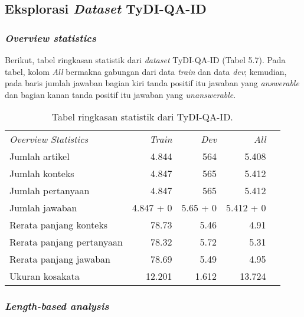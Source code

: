 \subsection{Eksplorasi \emph{Dataset} TyDI-QA-ID}

\subsubsection{\emph{Overview statistics}}
Berikut, tabel ringkasan statistik dari \emph{dataset} TyDI-QA-ID (Tabel 5.7). Pada tabel, kolom \emph{All} bermakna gabungan dari data \emph{train} dan data \emph{dev}; kemudian, pada baris jumlah jawaban bagian kiri tanda positif itu jawaban yang \emph{answerable} dan bagian kanan tanda positif itu jawaban yang \emph{unanswerable}.

\begin{table}[H]\centering
\begin{tabular}{lrrrr}\toprule
\emph{Overview Statistics} &\emph{Train} &\emph{Dev} &\emph{All} \\
Jumlah artikel &4.844 &564 &5.408 & \\
Jumlah konteks &4.847 &565 &5.412 & \\
Jumlah pertanyaan &4.847 &565 &5.412 & \\
Jumlah jawaban &4.847 + 0 &5.65 + 0 &5.412 + 0 & \\
Rerata panjang konteks &78.73 &5.46 &4.91 & \\
Rerata panjang pertanyaan &78.32 &5.72 &5.31 & \\
Rerata panjang jawaban &78.69 &5.49 &4.95 & \\
Ukuran kosakata &12.201 &1.612 &13.724 & \\
\bottomrule
\end{tabular}
\caption{Tabel ringkasan statistik dari TyDI-QA-ID.}
\end{table}

\subsubsection{\emph{Length-based analysis}}

